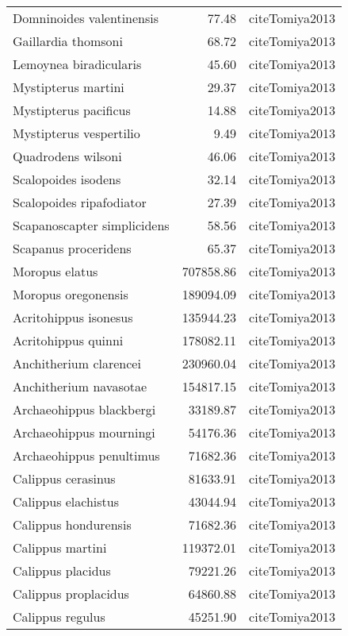 \begin{table}[ht]
\begin{tabular}{lrl}
  Domninoides valentinensis & 77.48 & cite{Tomiya2013} \\ 
  Gaillardia thomsoni & 68.72 & cite{Tomiya2013} \\ 
  Lemoynea biradicularis & 45.60 & cite{Tomiya2013} \\ 
  Mystipterus martini & 29.37 & cite{Tomiya2013} \\ 
  Mystipterus pacificus & 14.88 & cite{Tomiya2013} \\ 
  Mystipterus vespertilio & 9.49 & cite{Tomiya2013} \\ 
  Quadrodens wilsoni & 46.06 & cite{Tomiya2013} \\ 
  Scalopoides isodens & 32.14 & cite{Tomiya2013} \\ 
  Scalopoides ripafodiator & 27.39 & cite{Tomiya2013} \\ 
  Scapanoscapter simplicidens & 58.56 & cite{Tomiya2013} \\ 
  Scapanus proceridens & 65.37 & cite{Tomiya2013} \\ 
  Moropus elatus & 707858.86 & cite{Tomiya2013} \\ 
  Moropus oregonensis & 189094.09 & cite{Tomiya2013} \\ 
  Acritohippus isonesus & 135944.23 & cite{Tomiya2013} \\ 
  Acritohippus quinni & 178082.11 & cite{Tomiya2013} \\ 
  Anchitherium clarencei & 230960.04 & cite{Tomiya2013} \\ 
  Anchitherium navasotae & 154817.15 & cite{Tomiya2013} \\ 
  Archaeohippus blackbergi & 33189.87 & cite{Tomiya2013} \\ 
  Archaeohippus mourningi & 54176.36 & cite{Tomiya2013} \\ 
  Archaeohippus penultimus & 71682.36 & cite{Tomiya2013} \\ 
  Calippus cerasinus & 81633.91 & cite{Tomiya2013} \\ 
  Calippus elachistus & 43044.94 & cite{Tomiya2013} \\ 
  Calippus hondurensis & 71682.36 & cite{Tomiya2013} \\ 
  Calippus martini & 119372.01 & cite{Tomiya2013} \\ 
  Calippus placidus & 79221.26 & cite{Tomiya2013} \\ 
  Calippus proplacidus & 64860.88 & cite{Tomiya2013} \\ 
  Calippus regulus & 45251.90 & cite{Tomiya2013} \\ 

\end{tabular}
\end{table}
